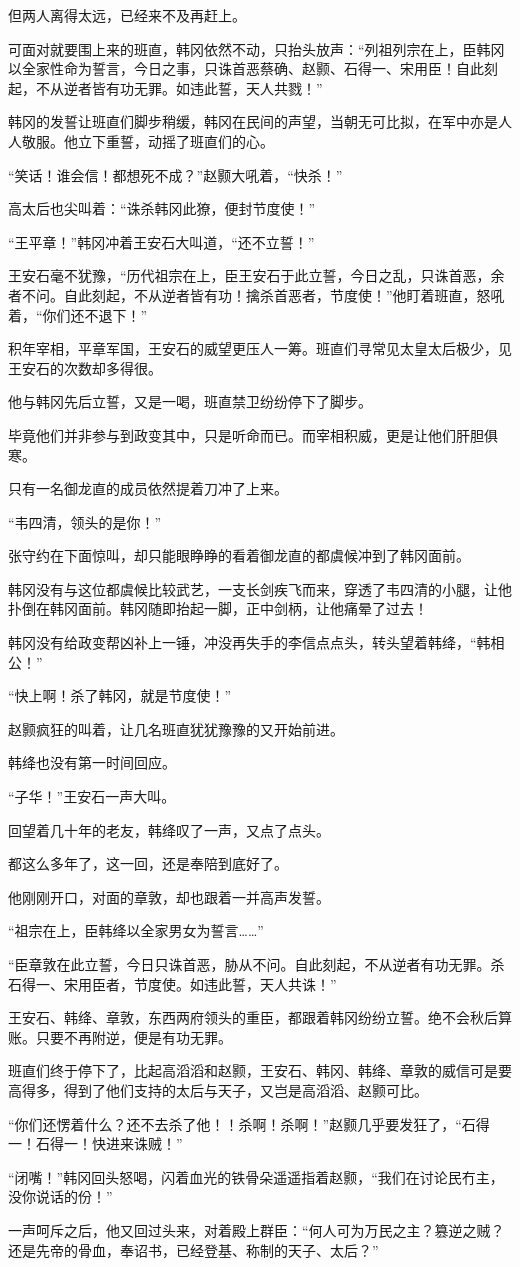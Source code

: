 但两人离得太远，已经来不及再赶上。

可面对就要围上来的班直，韩冈依然不动，只抬头放声：“列祖列宗在上，臣韩冈以全家性命为誓言，今日之事，只诛首恶蔡确、赵颢、石得一、宋用臣！自此刻起，不从逆者皆有功无罪。如违此誓，天人共戮！”

韩冈的发誓让班直们脚步稍缓，韩冈在民间的声望，当朝无可比拟，在军中亦是人人敬服。他立下重誓，动摇了班直们的心。

“笑话！谁会信！都想死不成？”赵颢大吼着，“快杀！”

高太后也尖叫着：“诛杀韩冈此獠，便封节度使！”

“王平章！”韩冈冲着王安石大叫道，“还不立誓！”

王安石毫不犹豫，“历代祖宗在上，臣王安石于此立誓，今日之乱，只诛首恶，余者不问。自此刻起，不从逆者皆有功！擒杀首恶者，节度使！”他盯着班直，怒吼着，“你们还不退下！”

积年宰相，平章军国，王安石的威望更压人一筹。班直们寻常见太皇太后极少，见王安石的次数却多得很。

他与韩冈先后立誓，又是一喝，班直禁卫纷纷停下了脚步。

毕竟他们并非参与到政变其中，只是听命而已。而宰相积威，更是让他们肝胆俱寒。

只有一名御龙直的成员依然提着刀冲了上来。

“韦四清，领头的是你！”

张守约在下面惊叫，却只能眼睁睁的看着御龙直的都虞候冲到了韩冈面前。

韩冈没有与这位都虞候比较武艺，一支长剑疾飞而来，穿透了韦四清的小腿，让他扑倒在韩冈面前。韩冈随即抬起一脚，正中剑柄，让他痛晕了过去！

韩冈没有给政变帮凶补上一锤，冲没再失手的李信点点头，转头望着韩绛，“韩相公！”

“快上啊！杀了韩冈，就是节度使！”

赵颢疯狂的叫着，让几名班直犹犹豫豫的又开始前进。

韩绛也没有第一时间回应。

“子华！”王安石一声大叫。

回望着几十年的老友，韩绛叹了一声，又点了点头。

都这么多年了，这一回，还是奉陪到底好了。

他刚刚开口，对面的章敦，却也跟着一并高声发誓。

“祖宗在上，臣韩绛以全家男女为誓言……”

“臣章敦在此立誓，今日只诛首恶，胁从不问。自此刻起，不从逆者有功无罪。杀石得一、宋用臣者，节度使。如违此誓，天人共诛！”

王安石、韩绛、章敦，东西两府领头的重臣，都跟着韩冈纷纷立誓。绝不会秋后算账。只要不再附逆，便是有功无罪。

班直们终于停下了，比起高滔滔和赵颢，王安石、韩冈、韩绛、章敦的威信可是要高得多，得到了他们支持的太后与天子，又岂是高滔滔、赵颢可比。

“你们还愣着什么？还不去杀了他！！杀啊！杀啊！”赵颢几乎要发狂了，“石得一！石得一！快进来诛贼！”

“闭嘴！”韩冈回头怒喝，闪着血光的铁骨朵遥遥指着赵颢，“我们在讨论民冇主，没你说话的份！”

一声呵斥之后，他又回过头来，对着殿上群臣：“何人可为万民之主？篡逆之贼？还是先帝的骨血，奉诏书，已经登基、称制的天子、太后？”

